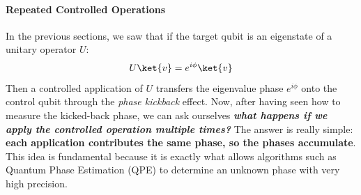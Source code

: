 \paragraph{Repeated Controlled Operations}\label{ex:repeated-controlled-operations}

In the previous sections, we saw that if the target qubit is an eigenstate of a unitary operator $U$:
\begin{equation*}
    U \ket{v} = e^{i \phi} \ket{v}
\end{equation*}
Then a controlled application of $U$ transfers the eigenvalue phase $e^{i \phi}$ onto the control qubit through the \emph{phase kickback} effect. Now, after having seen how to measure the kicked-back phase, we can ask ourselves \emph{\textbf{what happens if we apply the controlled operation multiple times?}} The answer is really simple: \textbf{each application contributes the same phase, so the phases accumulate}. This idea is fundamental because it is exactly what allows algorithms such as Quantum Phase Estimation (QPE) to determine an unknown phase with very high precision.

